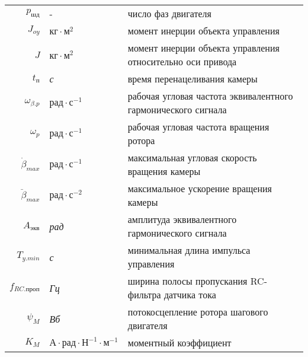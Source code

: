\begin{table}[ht!]
\begin{tabular}{rll}
    $p_{\textit{шд}}$               & -             & число фаз двигателя \\

    $J_{oy}$                        & $\textit{кг} \cdot \textit{м}^{2}$        & момент инерции объекта управления \\

    $J$                             & $\textit{кг} \cdot \textit{м}^{2}$        & момент инерции объекта управления относительно оси привода \\

    $t_\textit{п}$                  & \textit{с}                                & время перенацеливания камеры \\

    $\omega_{\beta.p}$              & $\textit{рад} \cdot \textit{с}^{-1}$      & рабочая угловая частота эквивалентного гармонического сигнала \\

    $\omega_{p}$                    & $\textit{рад} \cdot \textit{с}^{-1}$      & рабочая угловая частота вращения ротора \\

    $\dot{\beta}_{max}$             & $\textit{рад} \cdot \textit{с}^{-1}$      & максимальная угловая скорость вращения камеры \\

    $\ddot{\beta}_{max}$            & $\textit{рад} \cdot \textit{с}^{-2}$      & максимальное ускорение вращения камеры \\

    $A_{\textit{экв}}$              & \textit{рад}                              & амплитуда эквивалентного гармонического сигнала \\

    $T_{y.min}$                     & \textit{с}                                & минимальная длина импульса управления \\

    $f_{RC.\textit{проп}}$          & \textit{Гц}                               & ширина полосы пропускания RC-фильтра датчика тока \\

    $\psi_{M}$                      & \textit{Вб}                               & потокосцепление ротора шагового двигателя \\

    $K_{M}$                         & $\textit{А} \cdot \textit{рад} \cdot \textit{Н}^{-1} \cdot \textit{м}^{-1}$ & моментный коэффициент \\


\end{tabular}
\end{table}
